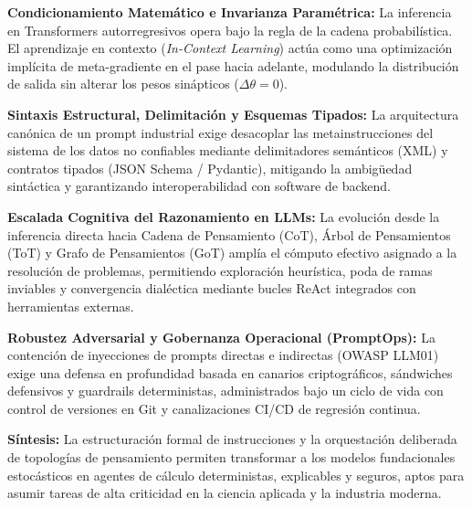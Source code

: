 \begin{resumenlist}[topsep=0.15cm, itemsep=0.15cm, parsep=0pt]
    \item \textbf{Condicionamiento Matemático e Invarianza Paramétrica:} La inferencia en Transformers autorregresivos opera bajo la regla de la cadena probabilística. El aprendizaje en contexto (\textit{In-Context Learning}) actúa como una optimización implícita de meta-gradiente en el pase hacia adelante, modulando la distribución de salida sin alterar los pesos sinápticos ($\Delta \theta = 0$).
    \item \textbf{Sintaxis Estructural, Delimitación y Esquemas Tipados:} La arquitectura canónica de un prompt industrial exige desacoplar las metainstrucciones del sistema de los datos no confiables mediante delimitadores semánticos (XML) y contratos tipados (JSON Schema / Pydantic), mitigando la ambigüedad sintáctica y garantizando interoperabilidad con software de backend.
    \item \textbf{Escalada Cognitiva del Razonamiento en LLMs:} La evolución desde la inferencia directa hacia Cadena de Pensamiento (CoT), Árbol de Pensamientos (ToT) y Grafo de Pensamientos (GoT) amplía el cómputo efectivo asignado a la resolución de problemas, permitiendo exploración heurística, poda de ramas inviables y convergencia dialéctica mediante bucles ReAct integrados con herramientas externas.
    \item \textbf{Robustez Adversarial y Gobernanza Operacional (PromptOps):} La contención de inyecciones de prompts directas e indirectas (OWASP LLM01) exige una defensa en profundidad basada en canarios criptográficos, sándwiches defensivos y guardrails deterministas, administrados bajo un ciclo de vida con control de versiones en Git y canalizaciones CI/CD de regresión continua.
\end{resumenlist}

\vspace{0.4cm}
\begin{cajabeige}
\textbf{Síntesis:} La estructuración formal de instrucciones y la orquestación deliberada de topologías de pensamiento permiten transformar a los modelos fundacionales estocásticos en agentes de cálculo deterministas, explicables y seguros, aptos para asumir tareas de alta criticidad en la ciencia aplicada y la industria moderna.
\end{cajabeige}

\newpage
{}
